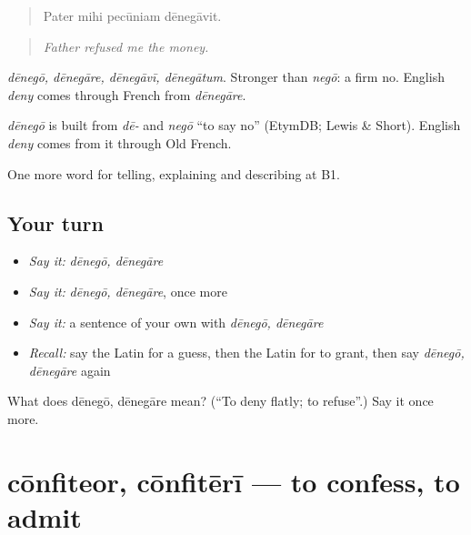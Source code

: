 \begin{quote}
Pater mihi pecūniam dēnegāvit.
\end{quote}

\begin{quote}
\emph{Father refused me the money.}
\end{quote}

\emph{dēnegō, dēnegāre, dēnegāvī, dēnegātum}. Stronger than \emph{negō}: a firm no. English \emph{deny} comes through French from \emph{dēnegāre}.

\begin{cousinweb}
\emph{dēnegō} is built from \emph{dē-} and \emph{negō} \textquotedblleft{}to say no\textquotedblright{} (EtymDB; Lewis \& Short). English \emph{deny} comes from it through Old French.
\end{cousinweb}

\begin{grammarlens}[title={What you've built}]
One more word for telling, explaining and describing at B1.
\end{grammarlens}

\subsection*{Your turn}
\begin{itemize}
\raggedright
  \item \emph{Say it:} \emph{dēnegō, dēnegāre}
  \item \emph{Say it:} \emph{dēnegō, dēnegāre}, once more
  \item \emph{Say it:} a sentence of your own with \emph{dēnegō, dēnegāre}
  \item \emph{Recall:} say the Latin for a guess, then the Latin for to grant, then say \emph{dēnegō, dēnegāre} again
\end{itemize}

\begin{tcolorbox}[breakable,colback=teal!4,colframe=teal!35!black,title={Before you move on}]
What does dēnegō, dēnegāre mean? (\textquotedblleft{}To deny flatly; to refuse\textquotedblright{}.) Say it once more.
\end{tcolorbox}
\section[cōnfiteor, cōnfitērī]{cōnfiteor, cōnfitērī — to confess, to admit}

\label{lesson:LA-C363-confiteor}



